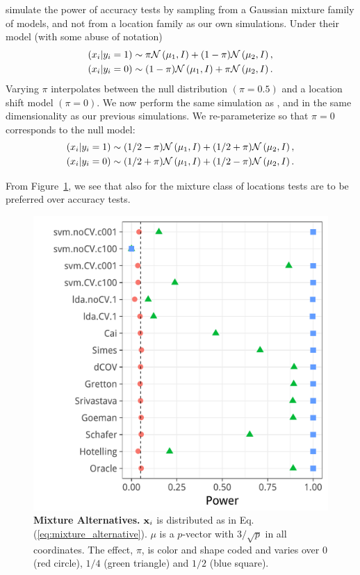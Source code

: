 \documentclass[journal]{IEEEtran}
\begin{document}
\cite{golland_permutation_2005} simulate the power of accuracy tests by sampling from a Gaussian mixture family of models, and not from a location family as our own simulations. 
Under their model (with some abuse of notation)
\begin{align*}
\begin{split}
(x_i|y_i=1) & \sim \pi \mathcal{N}\left(\mu_1,I\right)+ (1-\pi) \mathcal{N}\left(\mu_2,I\right), \\
(x_i|y_i=0) & \sim (1-\pi) \mathcal{N}\left(\mu_1,I\right)+ \pi \mathcal{N}\left(\mu_2,I\right).
\end{split}
\end{align*}
Varying $\pi$ interpolates between the null distribution $(\pi=0.5)$ and a location shift model $(\pi=0)$. 
We now perform the same simulation as \cite{golland_permutation_2005}, and in the same dimensionality as our previous simulations.
We re-parameterize so that $\pi=0$ corresponds to the null model:
\begin{align}
\begin{split}
\label{eq:mixture_alternative}
(x_i|y_i=1) & \sim (1/2-\pi) \gauss{\mu_1,I}+ (1/2+\pi) \gauss{\mu_2,I}, \\
(x_i|y_i=0) & \sim (1/2+\pi) \gauss{\mu_1,I}+ (1/2-\pi) \gauss{\mu_2,I}.	
\end{split}
\end{align}

From Figure~\ref{fig:file12}, we see that also for the mixture class of \cite{golland_permutation_2005} locations tests are to be preferred over accuracy tests. 




\begin{figure}[ht]
	\centering
	\includegraphics[width=0.5\columnwidth]{"art/file12"}
	\caption{\textbf{Mixture Alternatives.} $\mathbf{x}_i$ is distributed as in Eq.(\ref{eq:mixture_alternative}). 
		$\mu$ is a $p$-vector with $3/\sqrt{p}$ in all coordinates.
		The effect, $\pi$, is color and shape coded and varies over $0$ (red circle), $1/4$ (green triangle) and $1/2$ (blue square). }
	\label{fig:file12}
\end{figure}
\end{document}
